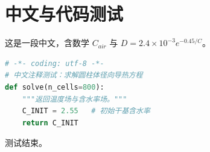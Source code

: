 ﻿\documentclass[UTF8,a4paper,12pt,withoutpreface,bwprint]{cumcmthesis}
\begin{document}
\section{中文与代码测试}
这是一段中文，含数学 $C_{air}$ 与 $D=2.4\times10^{-3}e^{-0.45/C}$。
\begin{lstlisting}[language=Python]
# -*- coding: utf-8 -*-
# 中文注释测试：求解圆柱体径向导热方程
def solve(n_cells=800):
    """返回温度场与含水率场。"""
    C_INIT = 2.55   # 初始干基含水率
    return C_INIT
\end{lstlisting}
测试结束。
\end{document}

